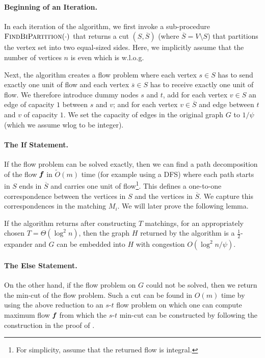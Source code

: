 \paragraph{Beginning of an Iteration.} In each iteration of the algorithm, we first invoke a sub-procedure $\textsc{FindBiPartition}(\cdot)$ that returns a cut $(S,\overline{S})$ (where $\overline{S} = V \setminus S$) that partitions the vertex set into two equal-sized sides. Here, we implicitly assume that the number of vertices $n$ is even which is w.l.o.g. 

Next, the algorithm creates a flow problem where each vertex $s \in S$ has to send exactly one unit of flow and each vertex $\overline{s} \in S$ has to receive exactly one unit of flow. We therefore introduce dummy nodes $s$ and $t$, add for each vertex $v \in S$ an edge of capacity $1$ between $s$ and $v$; and for each vertex $v \in \overline{S}$ and edge between $t$ and $v$ of capacity $1$. We set the capacity of edges in the original graph $G$ to $1/\psi$ (which we assume wlog to be integer).

\paragraph{The If Statement.} If the flow problem can be solved exactly, then we can find a path decomposition of the flow $\boldsymbol{\mathit{f}}$ in $\tilde{O}(m)$ time (for example using a DFS) where each path starts in $S$ ends in $\overline{S}$ and carries one unit of flow\footnote{For simplicity, assume that the returned flow is integral.}. This defines a one-to-one correspondence between the vertices in $S$ and the vertices in $\overline{S}$. We capture this correspondences in the matching $M_i$. We will later prove the following lemma.

\begin{lemma}
If the algorithm returns after constructing $T$ matchings, for an appropriately chosen $T = \Theta(\log^2 n)$, then the graph $H$ returned by the algorithm is a $\frac{1}{2}$-expander and $G$ can be embedded into $H$ with congestion $O(\log^2 n/ \psi)$.
\end{lemma}

\paragraph{The Else Statement.} On the other hand, if the flow problem on $G$ could not be solved, then we return the min-cut of the flow problem. Such a cut can be found in $O(m)$ time by using the above reduction to an $s$-$t$ flow problem on which one can compute maximum flow $\boldsymbol{\mathit{f}}$ from which the $s$-$t$ min-cut can be constructed by following the construction in the proof of .

